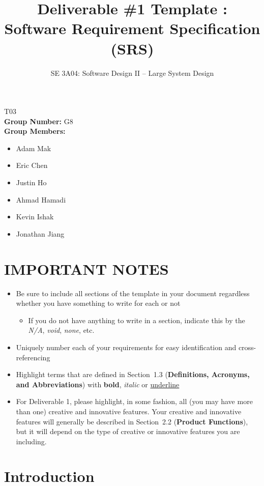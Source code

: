 \documentclass[]{article}
\title{Deliverable \#1 Template : Software Requirement Specification (SRS)}
\author{SE 3A04: Software Design II -- Large System Design}
\date{}
\begin{document}
\maketitle	
{} T03\\
{\bf Group Number:} G8 \\
{\bf Group Members:} 
\begin{itemize}
	\item Adam Mak
	\item Eric Chen
	\item Justin Ho
	\item Ahmad Hamadi
	\item Kevin Ishak
	\item Jonathan Jiang
\end{itemize}

\section*{IMPORTANT NOTES}
\begin{itemize}
	\item Be sure to include all sections of the template in your document regardless whether you have something to write for each or not
	\begin{itemize}
		\item If you do not have anything to write in a section, indicate this by the \emph{N/A}, \emph{void}, \emph{none}, etc.
	\end{itemize}
	\item Uniquely number each of your requirements for easy identification and cross-referencing
	\item Highlight terms that are defined in Section~1.3 (\textbf{Definitions, Acronyms, and Abbreviations}) with \textbf{bold}, \emph{italic} or \underline{underline}
	\item For Deliverable 1, please highlight, in some fashion, all (you may have more than one) creative and innovative features. Your creative and innovative features will generally be described in Section~2.2 (\textbf{Product Functions}), but it will depend on the type of creative or innovative features you are including.
\end{itemize}

\newpage
\section{Introduction}
\label{sec:introduction}
\end{document}
